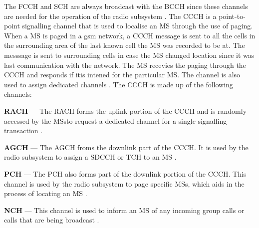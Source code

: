 The \gls{FCCH} and \gls{SCH} are always broadcast with the \gls{BCCH} since these channels are needed for the operation of the radio subsystem \cite{GSMArchitectureProtocolsServices}. The \gls{CCCH} is a point-to-point signalling channel that is used to localise an \gls{MS} through the use of paging\cite{GSMArchitectureProtocolsServices}. When a \gls{MS} is paged in a \gls{gsm} network, a \gls{CCCH} message is sent to all the cells in the surrounding area of the last known cell the \gls{MS} was recorded to be at\cite{GSMArchitectureProtocolsServices}. The messsage is sent to surrounding cells in case the \gls{MS} changed location since it was last communication with the network\cite{GSMArchitectureProtocolsServices}. The \gls{MS} recevies the paging through the \gls{CCCH} and responds if itis intened for the particular MS\cite{GSMArchitectureProtocolsServices}. The channel is also used to assign dedicated channels \cite{GSMArchitectureProtocolsServices}. The \gls{CCCH} is made up of the following channels:
\begin{description}
  \item{\textbf{\gls{RACH}}} --- The \gls{RACH} forms the uplink portion of the \gls{CCCH} and is randomly accessed by the \glspl{MS}to request a dedicated channel for a single signalling transaction \cite{GSMArchitectureProtocolsServices}.
  \item{\textbf{\gls{AGCH}}} --- The \gls{AGCH} froms the downlink part of the \gls{CCCH}\@. It is used by the radio subsystem to assign a \gls{SDCCH} or \gls{TCH} to an \gls{MS} \cite{GSMArchitectureProtocolsServices}.
  \item{\textbf{\gls{PCH}}} --- The \gls{PCH} also forms part of the downlink portion of the \gls{CCCH}\@. This channel is used by the radio subsystem to page specific \glspl{MS}, which aids in the process of locating an \gls{MS} \cite{GSMArchitectureProtocolsServices}.
\item{\textbf{\gls{NCH}}} --- This channel is used to inform an \gls{MS} of any incoming group calls or calls that are being broadcast \cite{GSMArchitectureProtocolsServices}.
\end{description}


